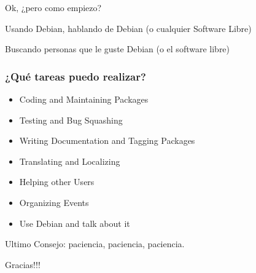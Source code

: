 \documentclass{beamer}
\begin{document}
\begin{frame}
 \centering
 \Huge Ok, ¿pero como empiezo?
\end{frame}

\begin{frame}
  \centering
  \Huge Usando Debian, hablando de Debian (o cualquier Software Libre)
\end{frame}

\begin{frame}
  \centering
  \Huge Buscando personas que le guste Debian (o el software libre)
\end{frame}

\begin{frame}
  \frametitle {¿Qué tareas puedo realizar?}
  \begin{itemize}
    \item Coding and Maintaining Packages \pause
    \item Testing and Bug Squashing \pause
    \item Writing Documentation and Tagging Packages \pause
    \item Translating and Localizing \pause
    \item Helping other Users \pause
    \item Organizing Events \pause
    \item Use Debian and talk about it
  \end{itemize}
\end{frame}

\begin{frame}
  \centering
  \huge Ultimo Consejo: paciencia, paciencia, paciencia.
\end{frame}

\begin{frame}
  \centering
  \Huge Gracias!!!
\end{frame}
\end{document}
